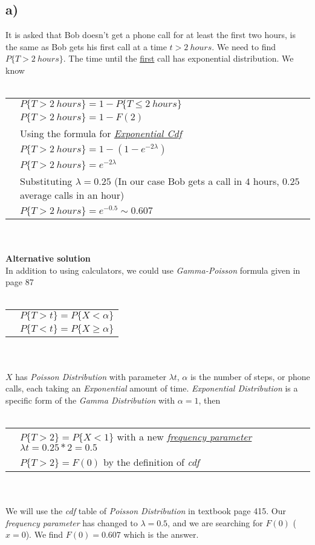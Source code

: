 \documentclass[12pt]{article}
\begin{document}
\subsection*{a)}
It is asked that Bob doesn't get a phone call
for at least the first two hours, is the same as Bob gets
his first call at a time $t>2\ hours$. We need to find $P\{T>2\ hours\}$.
The time until the \underline{first} call has exponential distribution.
We know
\\ \\
\begin{tabular}{l l}
    & $P\{T>2\ hours\}=1-P\{T\leq 2\ hours\}$\\
    & $P\{T>2\ hours\}=1-F(2)$\\
    & Using the formula for \hyperlink{exp}{\textit{Exponential Cdf}}\\
    & $P\{T>2\ hours\}=1-(1-e^{-2\lambda})$\\
    & $P\{T>2\ hours\}=e^{-2\lambda}$\hypertarget{lambda}{}\\
    & Substituting $\lambda = 0.25$ (In our case Bob gets a call in $4$ hours, $0.25$ average calls in an hour)\\
    & $P\{T>2\ hours\}=e^{-0.5} \sim 0.607$\\
\end{tabular}
\\ \\
\textbf{Alternative solution}\\
In addition to using calculators, we could use \hypertarget{g-p}{\textit{Gamma-Poisson}} formula given in page 87
\\ \\
\begin{tabular}{l l}
    & $P \{T > t\} = P \{X < \alpha\}$\\
    & $P \{T < t\} = P \{X \geq \alpha\}$\\
\end{tabular}
\\ \\
$X$ has \textit{Poisson Distribution} with parameter $\lambda t$,
$\alpha$ is the number of steps, or phone calls, each taking an \textit{Exponential} amount of time.
\textit{Exponential Distribution} is a specific form of the
\textit{Gamma Distribution} with $\alpha=1$, then
\\ \\
\begin{tabular}{l l}
    & $P \{T > 2\} = P \{X < 1\}$ with a new \hyperlink{freq}{\textit{frequency parameter}} $\lambda t = 0.25*2=0.5$\\
    & $P \{T > 2\} = F(0)$ by the definition of \hypertarget{cdf}{\textit{cdf}}\\
\end{tabular}
\\ \\
We will use the \textit{cdf} table of \textit{Poisson Distribution} in textbook page 415.
Our \textit{frequency parameter} has changed to $\lambda = 0.5$, and we are
searching for $F(0)$ ($x=0$). We find $F(0)=0.607$ which is the answer.
\end{document}
